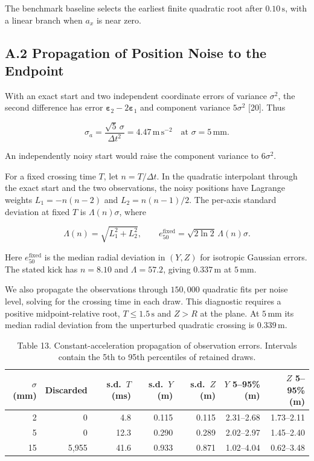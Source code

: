 The benchmark baseline selects the earliest finite quadratic root after $0.10\,\mathrm{s}$, with a linear branch when $a_x$ is near zero.

\subsection*{A.2 Propagation of Position Noise to the Endpoint}

With an exact start and two independent coordinate errors of variance $\sigma^2$, the second difference has error $\boldsymbol\varepsilon_2-2\boldsymbol\varepsilon_1$ and component variance $5\sigma^2$ [20]. Thus

$$
\sigma_a=\frac{\sqrt{5}\,\sigma}{\Delta t^2}=4.47\,\mathrm{m\,s^{-2}}
  \quad\text{at }\sigma=5\,\mathrm{mm}.
$$

An independently noisy start would raise the component variance to $6\sigma^2$.

For a fixed crossing time $T$, let $n=T/\Delta t$. In the quadratic interpolant through the exact start and the two observations, the noisy positions have Lagrange weights $L_1=-n(n-2)$ and $L_2=n(n-1)/2$. The per-axis standard deviation at fixed $T$ is $\Lambda(n)\sigma$, where

$$
\Lambda(n)=\sqrt{L_1^2+L_2^2},\qquad
  e_{50}^{\mathrm{fixed}}=\sqrt{2\ln 2}\,\Lambda(n)\sigma .
$$

Here $e_{50}^{\mathrm{fixed}}$ is the median radial deviation in $(Y,Z)$ for isotropic Gaussian errors. The stated kick has $n=8.10$ and $\Lambda=57.2$, giving $0.337\,\mathrm{m}$ at $5\,\mathrm{mm}$.

We also propagate the observations through $150{,}000$ quadratic fits per noise level, solving for the crossing time in each draw. This diagnostic requires a positive midpoint-relative root, $T\le1.5\,\mathrm{s}$ and $Z>R$ at the plane. At $5\,\mathrm{mm}$ its median radial deviation from the unperturbed quadratic crossing is $0.339\,\mathrm{m}$.

\begin{table}[htbp]
  
  
  \caption{Table 13. Constant-acceleration propagation of observation errors. Intervals contain the 5th to 95th percentiles of retained draws.}
  \begin{tabular}{rrrrrrr}
    \toprule
    $\sigma$ (mm) & Discarded & s.d.\ $T$ (ms) & s.d.\ $Y$ (m) & s.d.\ $Z$ (m) & $Y$ 5--95\% (m) & $Z$ 5--95\% (m) \\
    \midrule
    2  & 0     & 4.8  & 0.115 & 0.115 & 2.31--2.68 & 1.73--2.11 \\
    5  & 0     & 12.3 & 0.290 & 0.289 & 2.02--2.97 & 1.45--2.40 \\
    15 & 5{,}955 & 41.6 & 0.933 & 0.871 & 1.02--4.04 & 0.62--3.48 \\
    \bottomrule
  \end{tabular}
\end{table}

